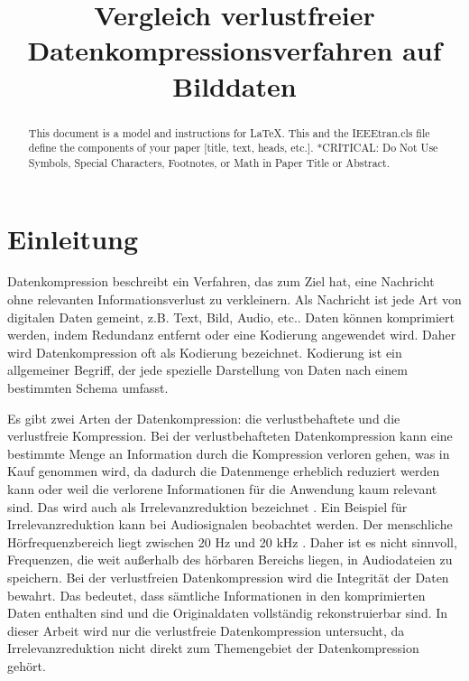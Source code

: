 \documentclass[conference]{IEEEtran}
\begin{document}
\title{Vergleich verlustfreier Datenkompressionsverfahren auf Bilddaten}

\author{
}

\maketitle

\begin{abstract}
    This document is a model and instructions for \LaTeX.
    This and the IEEEtran.cls file define the components of your paper [title, text, heads, etc.]. *CRITICAL: Do Not Use Symbols, Special Characters, Footnotes,
    or Math in Paper Title or Abstract.
\end{abstract}



\section{Einleitung}

Datenkompression beschreibt ein Verfahren, das zum Ziel hat, eine Nachricht
ohne relevanten Informationsverlust zu verkleinern.
Als Nachricht ist jede Art von digitalen Daten gemeint, z.B. Text, Bild, Audio, etc..
Daten können komprimiert werden, indem Redundanz entfernt oder eine Kodierung angewendet wird.
Daher wird Datenkompression oft als Kodierung bezeichnet.
Kodierung ist ein allgemeiner Begriff, der jede spezielle Darstellung von Daten nach
einem bestimmten Schema umfasst. \cite{Ingles}

Es gibt zwei Arten der Datenkompression: die verlustbehaftete und die verlustfreie Kompression.
Bei der verlustbehafteten Datenkompression kann eine bestimmte Menge an Information durch die
Kompression verloren gehen, was in Kauf genommen wird, da dadurch die Datenmenge erheblich
reduziert werden kann oder weil die verlorene Informationen für die Anwendung kaum relevant sind.
Das wird auch als Irrelevanzreduktion bezeichnet \cite[S. 5]{Maluck}.
Ein Beispiel für Irrelevanzreduktion kann bei Audiosignalen beobachtet werden.
Der menschliche Hörfrequenzbereich liegt zwischen 20 Hz und 20 kHz \cite{Burke}.
Daher ist es nicht sinnvoll, Frequenzen, die weit außerhalb des hörbaren Bereichs liegen,
in Audiodateien zu speichern.
Bei der verlustfreien Datenkompression wird die Integrität der Daten bewahrt.
Das bedeutet, dass sämtliche Informationen in den komprimierten Daten enthalten sind
und die Originaldaten vollständig rekonstruierbar sind.
In dieser Arbeit wird nur die verlustfreie Datenkompression untersucht, da
Irrelevanzreduktion nicht direkt zum Themengebiet der Datenkompression gehört.
\end{document}
